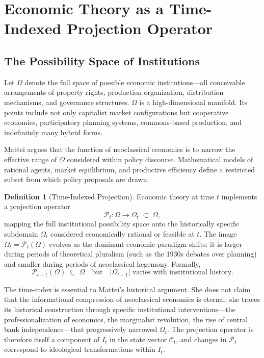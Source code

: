 \documentclass[12pt,a4paper]{article}
\theoremstyle{definition}
\newtheorem{definition}{Definition}[section]
\theoremstyle{remark}
\begin{document}
\section{Economic Theory as a Time-Indexed Projection Operator}
\label{sec:theory}

\subsection{The Possibility Space of Institutions}

Let $\Omega$ denote the full space of possible economic institutions---all conceivable arrangements of property rights, production organization, distribution mechanisms, and governance structures. $\Omega$ is a high-dimensional manifold. Its points include not only capitalist market configurations but cooperative economies, participatory planning systems, commons-based production, and indefinitely many hybrid forms.

Mattei argues that the function of neoclassical economics is to narrow the effective range of $\Omega$ considered within policy discourse. Mathematical models of rational agents, market equilibrium, and productive efficiency define a restricted subset from which policy proposals are drawn.

\begin{definition}[Time-Indexed Projection]
\label{def:projection}
Economic theory at time $t$ implements a projection operator
\begin{equation}
  \label{eq:projection}
  \mathcal{P}_t : \Omega \longrightarrow \Omega_t \;\subset\; \Omega,
\end{equation}
mapping the full institutional possibility space onto the historically specific subdomain $\Omega_t$ considered economically rational or feasible at $t$. The image $\Omega_t = \mathcal{P}_t(\Omega)$ evolves as the dominant economic paradigm shifts: it is larger during periods of theoretical pluralism (such as the 1930s debates over planning) and smaller during periods of neoclassical hegemony. Formally,
\begin{equation}
  \mathcal{P}_{t+1}(\Omega) \;\subseteq\; \Omega \quad\text{but}\quad
  \bigl|\Omega_{t+1}\bigr| \text{ varies with institutional history.}
\end{equation}
\end{definition}

The time-index is essential to Mattei's historical argument. She does not claim that the informational compression of neoclassical economics is eternal; she traces its historical construction through specific institutional interventions---the professionalization of economics, the marginalist revolution, the rise of central bank independence---that progressively narrowed $\Omega_t$. The projection operator is therefore itself a component of $I_t$ in the state vector $\mathcal{C}_t$, and changes in $\mathcal{P}_t$ correspond to ideological transformations within $I_t$.
\end{document}
